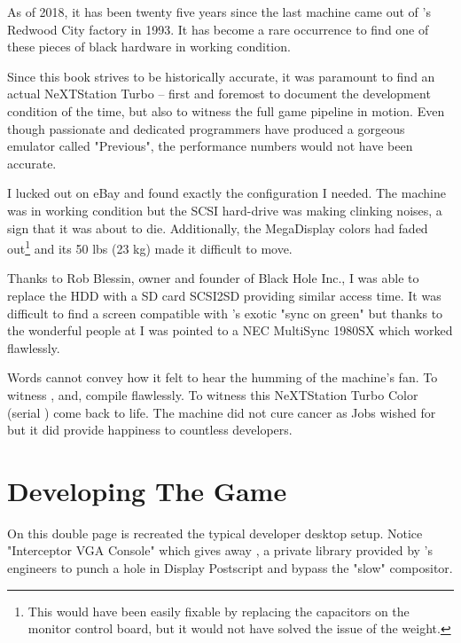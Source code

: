  As of 2018, it has been twenty five years since the last machine came out of \NeXT{}'s Redwood City factory in 1993. It has become a rare occurrence to find one of these pieces of black hardware in working condition.\\
 \par
 Since this book strives to be historically accurate, it was paramount to find an actual NeXTStation Turbo -- first and foremost to document the development condition of the time, but also to witness the full game pipeline in motion. Even though passionate and dedicated programmers have produced a gorgeous emulator called "Previous", the performance numbers would not have been accurate.\\
 \par
  I lucked out on eBay and found exactly the configuration I needed. The machine was in working condition but the SCSI hard-drive was making clinking noises, a sign that it was about to die. Additionally, the MegaDisplay colors had faded out\footnote{This would have been easily fixable by replacing the capacitors on the monitor control board, but it would not have solved the issue of the weight.} and its 50 lbs (23 kg) made it difficult to move.\\
  \par
  Thanks to Rob Blessin, owner and founder of Black Hole Inc., I was able to replace the HDD with a SD card SCSI2SD providing similar access time. It was difficult to find a screen compatible with \NeXTns{}'s exotic "sync on green" but thanks to the wonderful people at  I was pointed to a NEC MultiSync 1980SX which worked flawlessly.\\
  \par
  Words cannot convey how it felt to hear the humming of the machine's fan. To witness ,  and,  compile flawlessly. To witness this NeXTStation Turbo Color (serial ) come back to life. The machine did not cure cancer as Jobs wished for but it did provide happiness to countless developers.





\section{Developing The Game}
On this double page is recreated the typical developer desktop setup. Notice "Interceptor VGA Console" which gives away , a private library provided by \NeXTns's engineers to punch a hole in Display Postscript and bypass the "slow" compositor.\\
\par
{}

